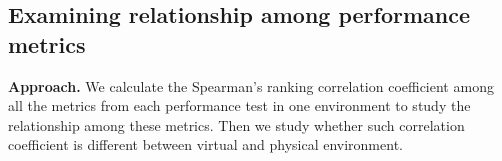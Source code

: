 \subsection{Examining relationship among performance metrics}






\textbf{Approach.} We calculate the Spearman's ranking correlation coefficient among all the metrics from each performance test in one environment to study the relationship among these metrics. Then we study whether such correlation coefficient is different between virtual and physical environment. 

